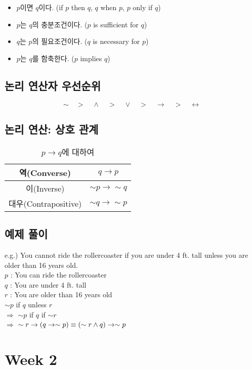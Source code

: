 \newpage
\begin{itemize}
    \item $p$이면 $q$이다. (if $p$ then $q$, $q$ when $p$, $p$ only if $q$)
    \item $p$는 $q$의 충분조건이다. ($p$ is sufficient for $q$)
    \item $q$는 $p$의 필요조건이다. ($q$ is necessary for $p$)
    \item $p$는 $q$를 함축한다. ($p$ implies $q$)
\end{itemize}

\subsection{논리 연산자 우선순위}
$$\sim\quad>\quad\land\quad>\quad\lor\quad>\quad\to\quad>\quad\leftrightarrow$$
\subsection{논리 연산: 상호 관계}
\begin{table}[]
    \caption {$p\to q$에 대하여}
    \centering
    \begin{tabular}[1.5]{c|c}
        역(Converse)&$q\to p$\\
        \hline
        이(Inverse)&$\sim p \to \sim q$\\
        \hline
        대우(Contrapositive)&$\sim q \to \sim p$
    \end{tabular}
\end{table}
\subsection{예제 풀이}
e.g.) You cannot ride the rollercoaster if you are under 4 ft. tall unless you are older than 16 years old.\\
$p$ : You can ride the rollercoaster\\
$q$ : You are under 4 ft. tall\\
$r$ : You are older than 16 years old\\
$\sim p$ if $q$ unless $r$\\$\Rightarrow$ $\sim p$ if $q$ if $\sim r$\\$\Rightarrow$ $\sim r \to (q \to \sim p)\\\equiv (\sim r \land q) \to \sim p$\\
\newpage
\section{Week 2}
